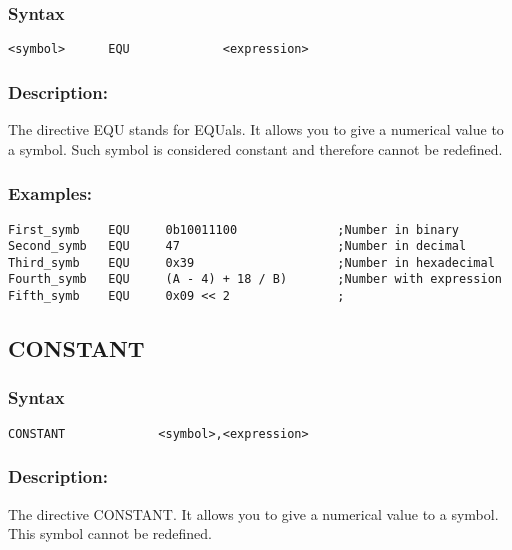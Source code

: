         \subsubsection{Syntax}
        {
            \usecodefont
            \verb'<symbol>      EQU             <expression> '
        }

        \subsubsection{Description:}
            The directive EQU stands for EQUals. It allows you to give a numerical value to a symbol. Such symbol is considered constant and therefore cannot be redefined.

        \subsubsection{Examples:}
        {
            \usecodefont
            \verb'First_symb    EQU     0b10011100              ;Number in binary'\\
            \verb'Second_symb   EQU     47                      ;Number in decimal'\\
            \verb'Third_symb    EQU     0x39                    ;Number in hexadecimal'\\
            \verb'Fourth_symb   EQU     (A - 4) + 18 / B)       ;Number with expression'\\
            \verb'Fifth_symb    EQU     0x09 << 2               ;'\\
        }

    \subsection{CONSTANT}
        \subsubsection{Syntax}
        {
            \usecodefont
            \verb'CONSTANT             <symbol>,<expression>'
        }

        \subsubsection{Description:}
            The directive CONSTANT. It allows you to give a numerical value to a symbol. This symbol cannot be redefined.

